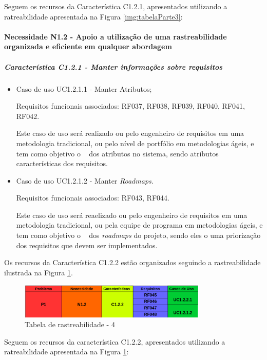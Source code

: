 	Seguem os recursos da Característica C1.2.1, apresentados utilizando a ratreabilidade apresentada na Figura \ref{img:tabelaParte3}:

\paragraph{Necessidade N1.2 - Apoio a utilização de uma rastreabilidade organizada e eficiente em qualquer abordagem}
	\subparagraph{Característica C1.2.1 - Manter informações sobre requisitos}
		\begin{itemize}
			
			\item Caso de uso UC1.2.1.1 - Manter Atributos;
			
			Requisitos funcionais associados: RF037, RF038, RF039, RF040, RF041, RF042.

			Este caso de uso será realizado ou pelo engenheiro de requisitos em uma metodologia tradicional, ou pelo nível de portfólio em metodologias ágeis, e tem como objetivo o \CRUD~ dos atributos no sistema, sendo atributos características dos requisitos.
		
			\item Caso de uso UC1.2.1.2 - Manter \textit{Roadmaps}.
			
			Requisitos funcionais associados: RF043, RF044.
			
			Este caso de uso será reaelizado ou pelo engenheiro de requisitos em uma metodologia tradicional, ou pela equipe de programa em metodologias ágeis, e tem como objetivo o \CRUD~ dos \textit{roadmaps} do projeto, sendo eles o uma priorização dos requisitos que devem ser implementados.

		\end{itemize}

		Os recursos da Característica C1.2.2 estão organizados seguindo a rastreabilidade ilustrada na Figura \ref{img:tabelaParte4}.

\begin{figure}[H]
	\centering
	\includegraphics[width=0.8\textwidth]{imgModelagem/tabelaParte4}
	\caption{Tabela de rastreabilidade - 4 }
	\label{img:tabelaParte4}
\end{figure}

	Seguem os recursos da característica C1.2.2, apresentados utilizando a ratreabilidade apresentada na Figura \ref{img:tabelaParte4}:

